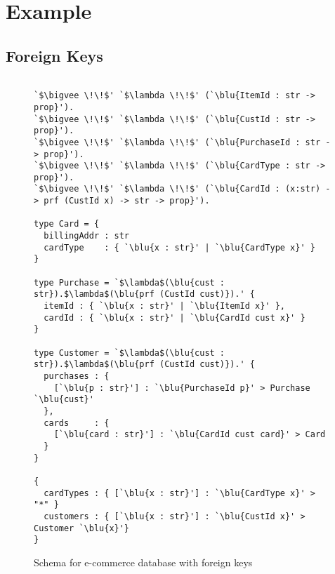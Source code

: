 \documentclass[sigplan,10pt,review,anonymous]{acmart}
\newcommand{\blu}[1]{\textbf{\color{blue}{#1}}}
\begin{document}




\section{Example}




\subsection{Foreign Keys}

\begin{figure}

\begin{lstlisting}[escapeinside=`']

`$\bigvee \!\!$' `$\lambda \!\!$' (`\blu{ItemId : str -> prop}').
`$\bigvee \!\!$' `$\lambda \!\!$' (`\blu{CustId : str -> prop}').
`$\bigvee \!\!$' `$\lambda \!\!$' (`\blu{PurchaseId : str -> prop}').
`$\bigvee \!\!$' `$\lambda \!\!$' (`\blu{CardType : str -> prop}').
`$\bigvee \!\!$' `$\lambda \!\!$' (`\blu{CardId : (x:str) -> prf (CustId x) -> str -> prop}').

type Card = {
  billingAddr : str
  cardType    : { `\blu{x : str}' | `\blu{CardType x}' }
}

type Purchase = `$\lambda$(\blu{cust : str}).$\lambda$(\blu{prf (CustId cust)}).' {
  itemId : { `\blu{x : str}' | `\blu{ItemId x}' }, 
  cardId : { `\blu{x : str}' | `\blu{CardId cust x}' }
}

type Customer = `$\lambda$(\blu{cust : str}).$\lambda$(\blu{prf (CustId cust)}).' { 
  purchases : { 
    [`\blu{p : str}'] : `\blu{PurchaseId p}' > Purchase `\blu{cust}' 
  },
  cards     : { 
    [`\blu{card : str}'] : `\blu{CardId cust card}' > Card 
  }
}

{
  cardTypes : { [`\blu{x : str}'] : `\blu{CardType x}' > "*" }
  customers : { [`\blu{x : str}'] : `\blu{CustId x}' > Customer `\blu{x}'}
}
\end{lstlisting}

\caption{Schema for e-commerce database with foreign keys}
\label{fig:ecommerce}
\end{figure}
\end{document}
